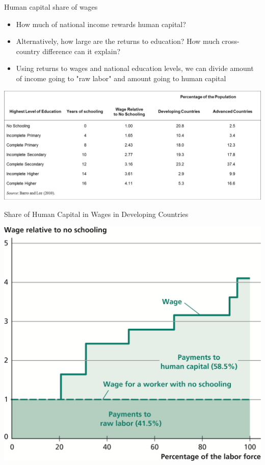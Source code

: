 \documentclass[10pt]{beamer}
\begin{document}
\begin{frame}[label={sec:org9d63228}]{}
\alert{Human capital share of wages}
\begin{itemize}
\item How much of national income rewards human capital?
\item Alternatively, how large are the returns to education? How much cross-country difference can it explain?
\item Using returns to wages and national education levels, we can divide amount of income going to "raw labor" and amount going to human capital
\end{itemize}
\end{frame}

\begin{frame}[label={sec:orgbacc8a7}]{}
\begin{center}
\includegraphics[width=.75\textwidth]{./img/tab6.2.png}
\end{center}
\end{frame}

\begin{frame}[label={sec:org74d9a1e}]{Share of Human Capital in Wages in Developing Countries}
\begin{center}
\includegraphics[width=.75\textwidth]{./img/6.9.png}
\end{center}
\end{frame}
\end{document}
